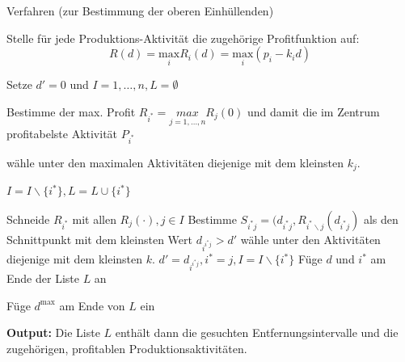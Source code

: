     \begin{algorithm}[H]
        \caption{Verfahren (zur Bestimmung der oberen Einhüllenden)}
        \begin{algorithmic}[1]
          \State Stelle für jede Produktions-Aktivität die zugehörige Profitfunktion auf:
          \begin{equation*}
            R(d) = \underset{i}{\text{max}}R_i(d) = \underset{i}{\text{max}}(p_i - k_id)
          \end{equation*}
          
          \State Setze $d' = 0$ und $I = {1, \dots, n}, L = \emptyset$

          \State Bestimme der max. Profit $R_{i^*} = \underset{j = 1, \dots, n}{max}R_{j}(0)$ und damit die im Zentrum profitabelste Aktivität $P_{i^*}$

            \State wähle unter den maximalen Aktivitäten diejenige mit dem kleinsten $k_j$.
          \EndIf

          \State $I = I \backslash \{i^*\}, L = L \cup \{i^* \}$

            \State Schneide $R_{i^*}$ mit allen $R_j(\cdot), j \in I$ 
            \State Bestimme $S_{i^{*}j} = (d_{i^{*}j}, R_{i^{*} \backslash j}(d_{i^{*}j})$ als den Schnittpunkt mit dem kleinsten Wert $d_{i^{i^{*}j}} > d'$
              \State wähle unter den Aktivitäten diejenige mit dem kleinsten $k$.  
            \EndIf
            \State $d' = d_{i^{i^{*}j}}, i^{*} = j, I = I \backslash \{i^*\}$
            \State Füge $d$ und $i^*$ am Ende der Liste $L$ an
          \EndWhile

          \State Füge $d^{\text{max}}$ am Ende von $L$ ein
          
        \end{algorithmic}
        \textbf{Output:} Die Liste $L$ enthält dann die gesuchten Entfernungsintervalle und die zugehörigen, profitablen Produktionsaktivitäten.
      \end{algorithm}

      \newpage

      \begin{exmp}

      \end{exmp}

